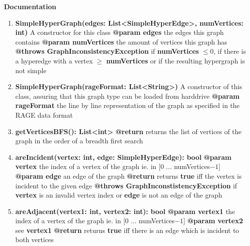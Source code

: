 \documentclass{article}
\begin{document}
	\textbf{Documentation}
	\begin{enumerate}[+]
		\item{
			\textbf{SimpleHyperGraph(edges: List<SimpleHyperEdge>, numVertices: int)} \newline
			A constructor for this class \newline
			\textbf{@param edges} the edges this graph contains \newline
			\textbf{@param numVertices} the amount of vertices this graph has \newline
			\textbf{@throws GraphInconsistencyException} if \textbf{numVertices} $\leq 0$, if there is a hyperedge with a vertex $\geq$ \textbf{numVertices} or if the resulting hypergraph is not simple
		}
		\item{
			\textbf{SimpleHyperGraph(rageFormat: List<String>)} \newline
			A constructor of this class, assuring that this graph type can be loaded from harddrive \newline
			\textbf{@param rageFormat} the line by line representation of the graph as specified in the RAGE data format
		}
		\item{
			\textbf{getVerticesBFS(): List<int>} \newline
			\textbf{@return} returns the list of vertices of the graph in the order of a breadth first search
		}
		\item{
			\textbf{areIncident(vertex: int, edge: SimpleHyperEdge): bool} \newline
			\textbf{@param vertex} the index of a vertex of the graph ie. in [0 ... numVertices$-1$]\newline
			\textbf{@param edge} an edge of the graph \newline 
			\textbf{@return} returns \textbf{true} iff the vertex is incident to the given edge \newline
			\textbf{@throws GraphInconstistencyException} if \textbf{vertex} is an invalid vertex index or \textbf{edge} is not an edge of the graph
		}
		\item{
			\textbf{areAdjacent(vertex1: int, vertex2: int): bool} \newline
			\textbf{@param vertex1} the index of a vertex of the graph ie. in [0 ... numVertices$-1$] \newline
			\textbf{@param vertex2} see \textbf{vertex1} \newline
			\textbf{@return} returns \textbf{true} iff there is an edge which is incident to both vertices \newline
}
\end{enumerate}
\end{document}
